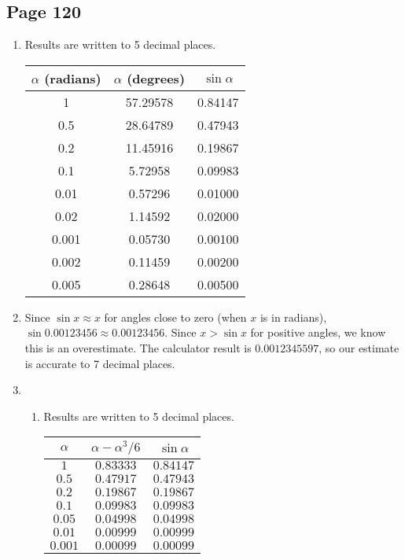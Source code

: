 \documentclass{article}
\newenvironment{solutions}[1]
{\subsection*{#1}
 \begin{enumerate}[leftmargin=1.5em]}
{\end{enumerate}}
\newcommand{\solution}{\item}
\newenvironment{subsolutions}
{\begin{enumerate}}
{\end{enumerate}}
\newcommand{\subsolution}{\item}
\begin{document}
\begin{solutions}{Page 120}
\solution %
Results are written to 5 decimal places.

\begin{center}
\bgroup
\def\arraystretch{1.3}
\setlength\tabcolsep{10pt}
\begin{tabular}{|c|c|c|}
\hline
$\alpha$ (radians) & $\alpha$ (degrees)  & $\sin{\alpha}$\\ \hline
1       & 57.29578 & 0.84147   \\ \hline
0.5     & 28.64789 & 0.47943   \\ \hline
0.2     & 11.45916 & 0.19867   \\ \hline
0.1     & 5.72958  & 0.09983   \\ \hline
0.01    & 0.57296  & 0.01000   \\ \hline
0.02    & 1.14592  & 0.02000   \\ \hline
0.001   & 0.05730  & 0.00100   \\ \hline
0.002   & 0.11459  & 0.00200   \\ \hline
0.005   & 0.28648  & 0.00500   \\ \hline
\end{tabular}
\egroup
\end{center}

\solution %
Since $\sin x \approx x$ for angles close to zero (when $x$ is in radians), $\sin 0.00123456 \approx 0.00123456$. Since $x > \sin{x}$ for positive angles, we know this is an overestimate. The calculator result is $0.0012345597$, so our estimate is accurate to 7 decimal places.

\solution %
\begin{subsolutions}

\subsolution %
Results are written to 5 decimal places.

\begin{center}
\bgroup
\def\arraystretch{1.3}
\setlength\tabcolsep{10pt}
\begin{tabular}{|c|c|c|}
\hline
$\alpha$
& $\alpha - \alpha^{3}/6$
& $\sin{\alpha}$\\
\hline
$1$
& $0.83333$
& $0.84147$\\
\hline
$0.5$
& $0.47917$
& $0.47943$\\
\hline
$0.2$
& $0.19867$
& $0.19867$\\
\hline
$0.1$
& $0.09983$
& $0.09983$\\
\hline
$0.05$
& $0.04998$
& $0.04998$\\
\hline
$0.01$
& $0.00999$
& $0.00999$\\
\hline
$0.001$
& $0.00099$
& $0.00099$\\
\hline
\end{tabular}
\egroup
\end{center}


\end{subsolutions}
\end{solutions}
\end{document}
